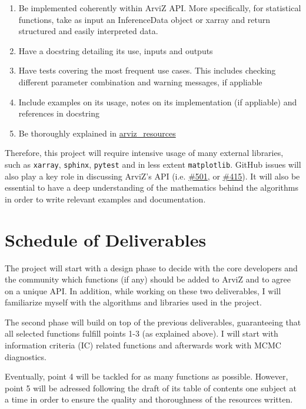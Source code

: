 \documentclass{article}
\begin{document}
\begin{enumerate}
\def\labelenumi{\arabic{enumi}.}

\item
  Be implemented coherently within ArviZ API. More specifically, for
  statistical functions, take as input an InferenceData object or xarray
  and return structured and easily interpreted data.
\item
  Have a docstring detailing its use, inputs and outputs
\item
  Have tests covering the most frequent use cases. This includes
  checking different parameter combination and warning messages, if
  appliable
\item
  Include examples on its usage, notes on its implementation (if
  appliable) and references in docstring
\item
  Be thoroughly explained in
  \href{https://github.com/arviz-devs/arviz_resources}{arviz\_resources}
\end{enumerate}

Therefore, this project will require intensive usage of many external
libraries, such as \texttt{xarray}, \texttt{sphinx}, \texttt{pytest} and
in less extent \texttt{matplotlib}. GitHub issues will also play a key
role in discussing ArviZ's API (i.e.
\href{https://github.com/arviz-devs/arviz/issues/501}{\#501}, or
\href{https://github.com/arviz-devs/arviz/issues/415}{\#415}). It will
also be essential to have a deep understanding of the mathematics behind
the algorithms in order to write relevant examples and documentation.

\section{Schedule of Deliverables}\label{schedule-of-deliverables}

The project will start with a design phase to decide with the core
developers and the community which functions (if any) should be added to
ArviZ and to agree on a unique API. In addition, while working on these
two deliverables, I will familiarize myself with the algorithms and
libraries used in the project.

The second phase will build on top of the previous deliverables,
guaranteeing that all selected functions fulfill points 1-3 (as
explained above). I will start with information criteria (IC) related
functions and afterwards work with MCMC diagnostics.

Eventually, point 4 will be tackled for as many functions as possible.
However, point 5 will be adressed following the draft of its table of
contents one subject at a time in order to ensure the quality and
thoroughness of the resources written.
\end{document}
